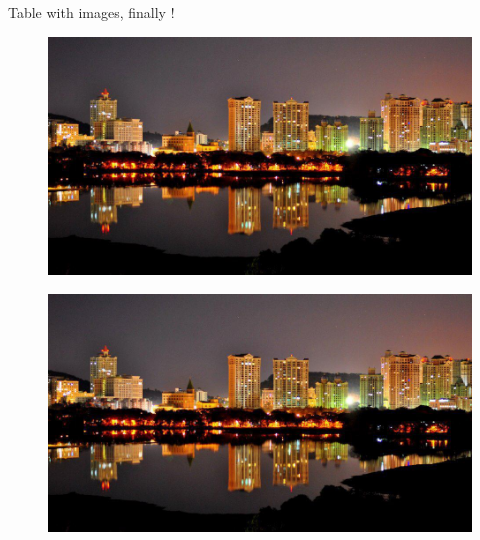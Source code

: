 \documentclass[a4paper,12pt]{extarticle}
\begin{document}
\begin{table}[ht]
\caption{Table with images, finally !}
\begin{subfigure}{0.41\columnwidth}
\includegraphics[width=1.3\linewidth]{img3.jpg}
    \label{fig:tablef1}
\end{subfigure}\hfill
\begin{subfigure}{0.41\columnwidth}
\includegraphics[width=1.3\linewidth]{img3.jpg}   
    \label{fig:tablef2}             
\end{subfigure}\\[1em]


\end{table}
\end{document}
